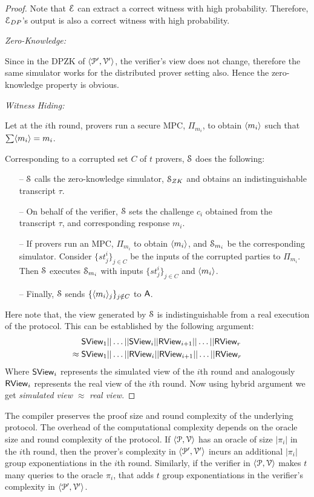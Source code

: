 \begin{proof}
	Note that $\mathcal{E}$ can extract a correct witness with high probability. Therefore, $\mathcal{E}_{DP}$'s output is also a correct witness with high probability.
	
	\textit{Zero-Knowledge:}
	
	Since in the DPZK of $\langle \mathcal{P}', \mathcal{V}' \rangle$, the verifier's view does not change, therefore the same simulator works for the distributed prover setting also. Hence the zero-knowledge property is obvious.
	
	\textit{Witness Hiding:} 
	
	Let at the $i$th round, provers run a secure MPC, $\Pi_{m_i}$, to obtain $\langle m_i \rangle$ such that $\sum \langle m_i \rangle = m_i$.
	
	Corresponding to a corrupted set $C$ of $t$ provers, $\mathcal{S}$ does the following:
	\begin{itemize}
		\item[--] $\mathcal{S}$ calls the zero-knowledge simulator, $\mathcal{S}_{ZK}$ and obtains an indistinguishable transcript $\tau$.
		\item[--] On behalf of the verifier, $\mathcal{S}$ sets the challenge $c_i$ obtained from the transcript $\tau$, and corresponding response $m_i$.
		\item[--] If provers run an MPC, $\Pi_{m_i}$ to obtain $\langle m_i \rangle$, and $\mathcal{S}_{m_i}$ be the corresponding simulator. Consider $\{st^i_j\}_{j\in C}$ be the inputs of the corrupted parties to $\Pi_{m_i}$. Then $\mathcal{S}$ executes $\mathcal{S}_{m_i}$ with inputs $\{st^i_j\}_{j\in C}$ and $\langle m_i \rangle$.
		\item[--] Finally, $\mathcal{S}$ sends $\{\langle m_i \rangle_j\}_{j\notin C}$ to $\mathsf{A}$.
	\end{itemize}
	Here note that, the view generated by $\mathcal{S}$ is indistinguishable from a real execution of the protocol. This can be established by the following argument:
	\begin{align*}
	& \mathsf{S View}_1 || \ldots ||\mathsf{S View}_i || \mathsf{R View}_{i+1}|| \ldots || \mathsf{R View}_r \\
	\approx\; & \mathsf{S View}_1 || \ldots ||\mathsf{R View}_i || \mathsf{R View}_{i+1}|| \ldots || \mathsf{R View}_r 
	\end{align*}
	Where $\mathsf{S View}_i$ represents the simulated view of the $i$th round and analogously $\mathsf{R View}_i$ represents the real view of the $i$th round.
	Now using hybrid argument we get \textit{simulated view} $\approx$ \textit{real view}.
\end{proof}
The compiler preserves the proof size and round complexity of the underlying protocol. The overhead of the computational complexity depends on the oracle size and round complexity of the protocol. If $\langle \mathcal{P}, \mathcal{V} \rangle$ has an oracle of size $|\pi_i|$ in the $i$th round, then the prover's complexity in $\langle \mathcal{P}', \mathcal{V}' \rangle$ incurs an additional $|\pi_i|$ group exponentiations in the $i$th round. Similarly, if the verifier in $\langle \mathcal{P}, \mathcal{V} \rangle$ makes $t$ many queries to the oracle $\pi_i$, that adds $t$ group exponentiations in the verifier's complexity in $\langle \mathcal{P}', \mathcal{V}' \rangle$.

